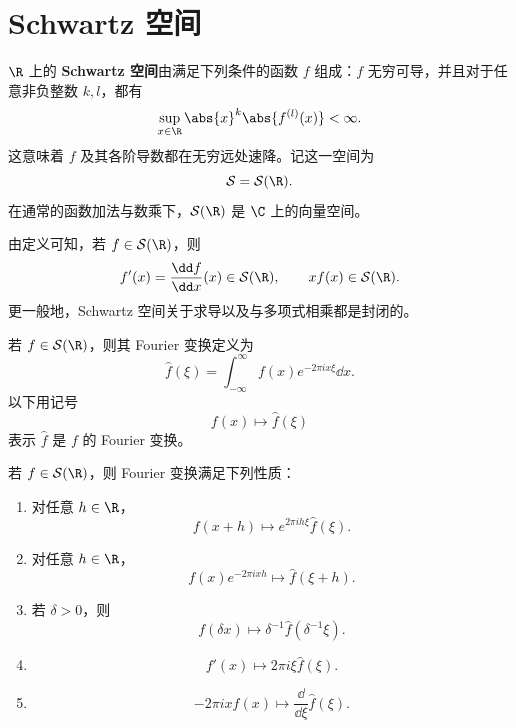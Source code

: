 \section{Schwartz 空间}

\begin{definition}
\(\R\) 上的 \textbf{Schwartz 空间}由满足下列条件的函数 \(f\) 组成：\(f\) 无穷可导，并且对于任意非负整数 \(k,l\)，都有
\[
\sup_{x\in\R}\abs{x}^{k}\abs{f^{(l)}(x)}<\infty.
\]
这意味着 \(f\) 及其各阶导数都在无穷远处速降。记这一空间为
\[
\mathcal S=\mathcal S(\R).
\]
在通常的函数加法与数乘下，\(\mathcal S(\R)\) 是 \(\C\) 上的向量空间。
\end{definition}

由定义可知，若 \(f\in\mathcal S(\R)\)，则
\[
f'(x)=\frac{\dd f}{\dd x}(x)\in\mathcal S(\R),
\qquad
xf(x)\in\mathcal S(\R).
\]
更一般地，Schwartz 空间关于求导以及与多项式相乘都是封闭的。

\begin{definition}
若 \(f\in\mathcal S(\R)\)，则其 Fourier 变换定义为
\[
\widehat f(\xi)
=\int_{-\infty}^{\infty}f(x)e^{-2\pi i x\xi}\dd x.
\]
以下用记号
\[
f(x)\longmapsto\widehat f(\xi)
\]
表示 \(\widehat f\) 是 \(f\) 的 Fourier 变换。
\end{definition}

\begin{proposition}\label{prop:fourier-basic-properties-schwartz}
若 \(f\in\mathcal S(\R)\)，则 Fourier 变换满足下列性质：
\begin{enumerate}[label=(\roman*)]
\item 对任意 \(h\in\R\)，
\[
f(x+h)\longmapsto e^{2\pi i h\xi}\widehat f(\xi).
\]

\item 对任意 \(h\in\R\)，
\[
f(x)e^{-2\pi i xh}\longmapsto\widehat f(\xi+h).
\]

\item 若 \(\delta>0\)，则
\[
f(\delta x)\longmapsto\delta^{-1}\widehat f(\delta^{-1}\xi).
\]

\item
\[
f'(x)\longmapsto2\pi i\xi\widehat f(\xi).
\]

\item
\[
-2\pi ixf(x)\longmapsto\frac{\dd}{\dd\xi}\widehat f(\xi).
\]
\end{enumerate}
\end{proposition}


